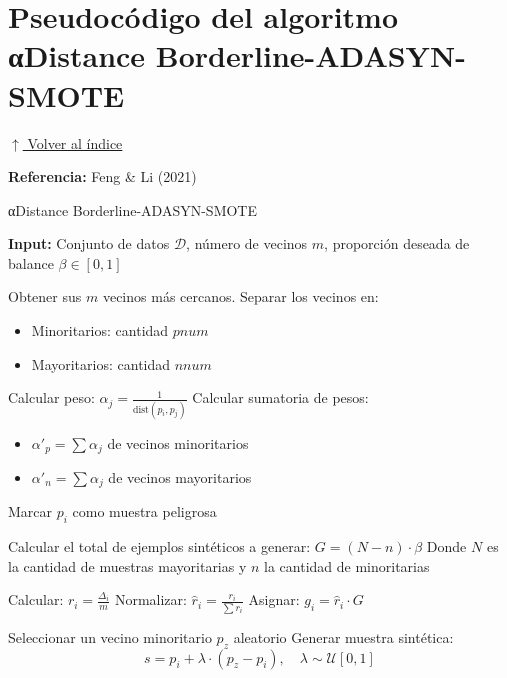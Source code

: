 \section*{Pseudocódigo del algoritmo αDistance Borderline-ADASYN-SMOTE}
\noindent\hyperlink{toc}{\small$\uparrow$ Volver al índice}

\textbf{Referencia:} Feng \& Li (2021)

\begin{algorithm}[H]
\caption{αDistance Borderline-ADASYN-SMOTE}
\begin{algorithmic}[1]
\State \textbf{Input:} Conjunto de datos $\mathcal{D}$, número de vecinos $m$, proporción deseada de balance $\beta \in [0, 1]$
\Statex

    \State Obtener sus $m$ vecinos más cercanos.
    \State Separar los vecinos en:
    \begin{itemize}
        \item Minoritarios: cantidad $pnum$
        \item Mayoritarios: cantidad $nnum$
    \end{itemize}
        \State Calcular peso: $\alpha_j = \frac{1}{\text{dist}(p_i, p_j)}$
    \EndFor
    \State Calcular sumatoria de pesos:
    \begin{itemize}
        \item $\alpha'_p = \sum \alpha_j$ de vecinos minoritarios
        \item $\alpha'_n = \sum \alpha_j$ de vecinos mayoritarios
    \end{itemize}
        \State Marcar $p_i$ como muestra peligrosa
    \EndIf
\EndFor

\vspace{1em}
\State Calcular el total de ejemplos sintéticos a generar: $G = (N - n) \cdot \beta$
\Statex Donde $N$ es la cantidad de muestras mayoritarias y $n$ la cantidad de minoritarias

\vspace{1em}
    \State Calcular: $r_i = \frac{\Delta_i}{m}$
    \State Normalizar: $\hat{r}_i = \frac{r_i}{\sum r_i}$
    \State Asignar: $g_i = \hat{r}_i \cdot G$
\EndFor

\vspace{1em}
        \State Seleccionar un vecino minoritario $p_z$ aleatorio
        \State Generar muestra sintética:
        \[
        s = p_i + \lambda \cdot (p_z - p_i), \quad \lambda \sim \mathcal{U}[0, 1]
        \]
    \EndFor
\EndFor
\end{algorithmic}
\end{algorithm}

